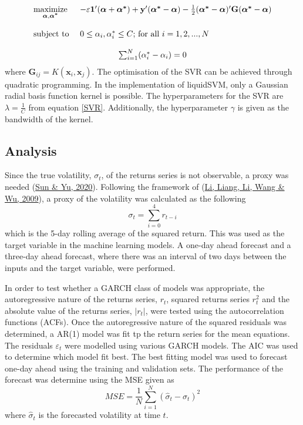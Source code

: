 \documentclass[11pt,preprint, authoryear]{elsarticle}
\numberwithin{equation}{section}
\numberwithin{figure}{section}
\numberwithin{table}{section}
\begin{document}
\begin{equation}
    \begin{array}{ll}
    \underset{\boldsymbol{\alpha}, \boldsymbol{\alpha^* }}{\text{maximize}} & -\varepsilon \mathbf{1}'(\boldsymbol{\alpha} + \boldsymbol{\alpha^* }) + \mathbf{y}'(\boldsymbol{\alpha^* } - \boldsymbol{\alpha})- \frac{1}{2} (\boldsymbol{\alpha^* } - \boldsymbol{\alpha})'\textbf{G}(\boldsymbol{\alpha^*} - \boldsymbol{\alpha}) \\
    & \\
    \text{subject to } & 0 \leq \alpha_i, \alpha_i^* \leq C \text{; for all } i = 1,2,...,N \\
    & \\
    \multicolumn{2}{c}{\sum_{i=1}^N (\alpha_i^* - \alpha_i) = 0}
    \end{array}
\end{equation} where
\(\mathbf{G}_{ij} = K(\mathbf{x}_i, \mathbf{x}_j).\) The optimisation of
the SVR can be achieved through quadratic programming. In the
implementation of liquidSVM, only a Gaussian radial basis function
kernel is possible. The hyperparameters for the SVR are
\(\lambda = \frac{1}{C}\) from equation \ref{SVR}. Additionally, the
hyperparameter \(\gamma\) is given as the bandwidth of the kernel.

\hypertarget{analysis}{%
\subsection{Analysis}\label{analysis}}

Since the true volatility, \(\sigma_t\), of the returns series is not
observable, a proxy was needed (\protect\hyperlink{ref-svr-GARCH}{Sun \&
Yu, 2020}). Following the framework of (\protect\hyperlink{ref-li}{Li,
Liang, Li, Wang \& Wu, 2009}), a proxy of the volatility was calculated
as the following \begin{equation}
\sigma_t = \sum_{i=0}^4 r_{t-i}
\end{equation} which is the 5-day rolling average of the squared return.
This was used as the target variable in the machine learning models. A
one-day ahead forecast and a three-day ahead forecast, where there was
an interval of two days between the inputs and the target variable, were
performed.

\par

In order to test whether a GARCH class of models was appropriate, the
autoregressive nature of the returns series, \(r_t\), squared returns
series \(r_t^2\) and the absolute value of the returns series,
\(|r_t|\), were tested using the autocorrelation functions (ACFs). Once
the autoregressive nature of the squared residuals was determined, a
AR(1) model was fit tp the return series for the mean equations. The
residuals \(\varepsilon_t\) were modelled using various GARCH models.
The AIC was used to determine which model fit best. The best fitting
model was used to forecast one-day ahead using the training and
validation sets. The performance of the forecast was determine using the
MSE given as \[
MSE = \frac{1}{N}\sum_{i=1}^N(\hat{\sigma}_t - \sigma_t)^2
\] where \(\hat{\sigma}_t\) is the forecasted volatility at time \(t\).
\end{document}

